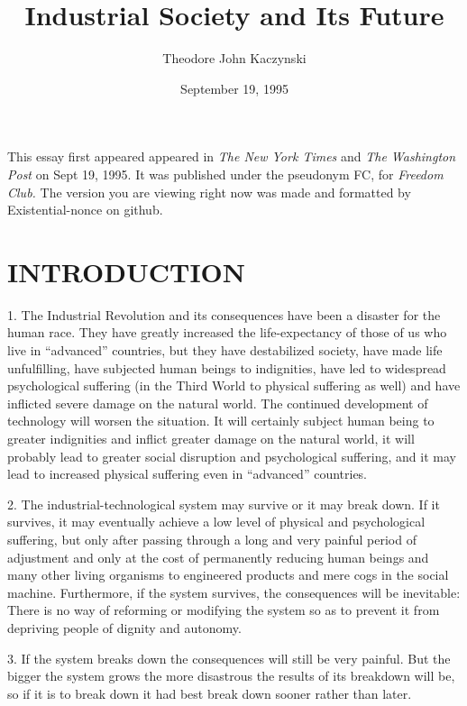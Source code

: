 \documentclass{article}
\title{Industrial Society and Its Future}
\author{\small{Theodore John Kaczynski}}
\date{\small{September 19, 1995}}
\begin{document}
\maketitle
\small{This essay first appeared appeared in \textit{The New York Times} and \textit{The Washington Post} on Sept 19, 1995. It was published under the pseudonym FC, for \textit{Freedom Club.} The version you are viewing right now was made and formatted by Existential-nonce on github.}
\clearpage

\section{INTRODUCTION}
\hspace{0.5cm} 1. The Industrial Revolution and its consequences have been a disaster for the human race. They have greatly increased the life-expectancy of those of us who live in “advanced” countries, but they have destabilized society, have made life unfulfilling, have subjected human beings to indignities, have led to widespread psychological suffering (in the Third World to physical suffering as well) and have inflicted severe damage on the natural world. The continued 
development of technology will worsen the situation. It will certainly subject human being to greater indignities and inflict greater damage on the natural world, it will probably lead to greater 
social disruption and psychological suffering, and it may lead to increased physical suffering even 
in “advanced” countries. \vspace{\baselineskip}

2. The industrial-technological system may survive or it may break down. If it survives, it may 
eventually achieve a low level of physical and psychological suffering, but only after passing through a long and very painful period of adjustment and only at the cost of permanently reducing human beings and many other living organisms to engineered products and mere cogs in the social 
machine. Furthermore, if the system survives, the consequences will be inevitable: There is no way of reforming or modifying the system so as to prevent it from depriving people of dignity and 
autonomy. \vspace{\baselineskip}

3. If the system breaks down the consequences will still be very painful. But the bigger the system 
grows the more disastrous the results of its breakdown will be, so if it is to break down it had best 
break down sooner rather than later. \vspace{\baselineskip}
\end{document}
